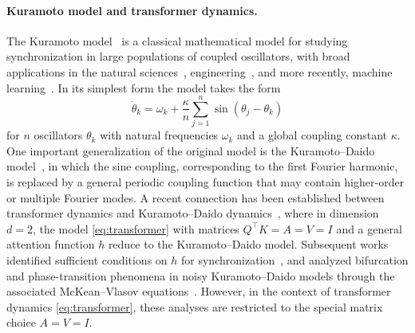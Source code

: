 \documentclass[10pt]{article}
\theoremstyle{definition}
\theoremstyle{definition}
\numberwithin{equation}{section}
\begin{document}
\paragraph{Kuramoto model and transformer dynamics.}
The Kuramoto model~\cite{kuramoto1975,kuramoto1984chemical} is a classical mathematical model for studying synchronization in large populations of coupled oscillators, with broad applications in the natural sciences~\cite{emerging2002istvan,generative2010breakspear,acebron2005kuramoto}, engineering~\cite{wiesenfeld1998frequency,filatrella2008analysis,dorfler2014synchronization}, and more recently, machine learning~\cite{bohm2010clustering,nguyen2024coupled,miyato2025artificial,song2026kuramoto}. In its simplest form the model takes the form
\begin{equation}
    \label{eq:related_kuramoto}
\dot \theta_k = \omega_k + \frac{\kappa}{n} \sum_{j=1}^n \sin (\theta_j - \theta_k)
\end{equation}
for $n$ oscillators $\theta_k$ with natural frequencies $\omega_k$ and a global coupling constant $\kappa$.
One important generalization of the original model is the Kuramoto--Daido model~\cite{daido1992order,generic1994daido}, in which the sine coupling, corresponding to the first Fourier harmonic, is replaced by a general periodic coupling function that may contain higher-order or multiple Fourier modes.
A recent connection has been established between transformer dynamics and Kuramoto--Daido dynamics~\cite{geshkovski2023mathematical}, where in dimension $d=2$, the model \eqref{eq:transformer} with matrices $Q^{\top} K = A = V = I$ and a general attention function $h$ reduce to the Kuramoto--Daido model.
Subsequent works identified sufficient conditions on $h$ for synchronization~\cite{criscitiello2024synchronization,polyanskiy2025synchronization}, and analyzed bifurcation and phase-transition phenomena in noisy Kuramoto--Daido models through the associated McKean--Vlasov equations~\cite{balasubramanian2025structure,mun2026phaseA}.
However, in the context of transformer dynamics \eqref{eq:transformer}, these analyses are restricted to the special matrix choice $A = V = I$.
\end{document}
